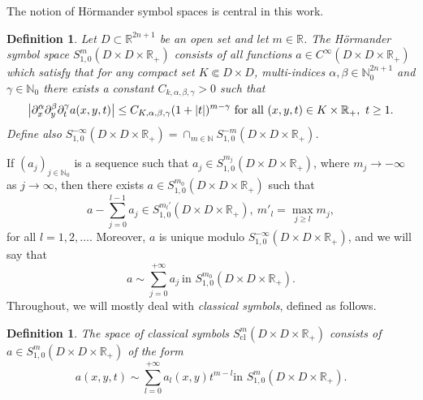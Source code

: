 \documentclass{article}
\newtheorem{definition}[theorem]{Definition}
\newcommand{\RR}{\mathbb R}
\newcommand{\NN}{\mathbb N}
\DeclareMathOperator{\cl}{cl}
\begin{document}
The notion of H\"{o}rmander symbol spaces is central in this work.
%
\begin{definition} Let $D \subset \RR^{2n+1}$ be an open set and let $m \in \RR$. The H\"{o}rmander symbol space $S^m_{1,0}(D \times D \times \RR_+)$ consists of all functions $a \in C^\infty(D \times D \times \RR_+)$ which satisfy that for any compact set $K \Subset D \times D$, multi-indices $\alpha, \beta \in \NN_0^{2n+1}$ and $\gamma \in \NN_0$ there exists a constant $C_{k, \alpha, \beta, \gamma} > 0$ such that
\begin{equation*} \big{|}\partial^\alpha_x \partial^\beta_y \partial^\gamma_t a(x,y,t) \big{|} \le C_{K,\alpha, \beta, \gamma} (1+|t|)^{m - \gamma}\ \text{for all }(x,y,t) \in K \times \RR_+,\ t \ge 1.\end{equation*} Define also $S^{-\infty}_{1,0}(D \times D \times \RR_+) = \cap_{m \in \NN} S^{-m}_{1,0}(D \times D \times \RR_+)$.\end{definition}
%
If $(a_j)_{j \in \NN_0}$ is a sequence such that $a_j \in S^{m_j}_{1,0}(D \times D \times \RR_+)$, where $m_j \to -\infty$ as $j \to \infty$, then there exists $a \in S^{m_0}_{1,0}(D \times D \times \RR_+)$ such that 
\begin{equation*} a-\sum_{j=0}^{l-1} a_j \in S^{m_l'}_{1,0}(D \times D \times \RR_+),\ m'_l = \max_{j \ge l} m_j,\end{equation*}
for all $l=1,2,\ldots$. 
Moreover, $a$ is unique modulo $S^{-\infty}_{1,0}(D \times D \times \RR_+)$, and we will say that $$a \sim \sum^{+\infty}_{j = 0}a_j \ \text{in }S^{m_0}_{1,0}(D \times D \times \RR_+).$$
%
Throughout, we will mostly deal with \textit{classical symbols}, defined as follows.
\begin{definition}\label{clhs} The space of classical symbols $S^m_{\cl}(D \times D \times \RR_+)$ consists of $a\in S^m_{1,0}(D \times D \times \RR_+)$ of the form
\begin{equation*} a(x,y,t) \sim \sum^{+\infty}_{l=0} a_l(x,y) t^{m-l} \text{in }S^m_{1,0}(D \times D \times \RR_+).\end{equation*}\end{definition}
%
\end{document}
